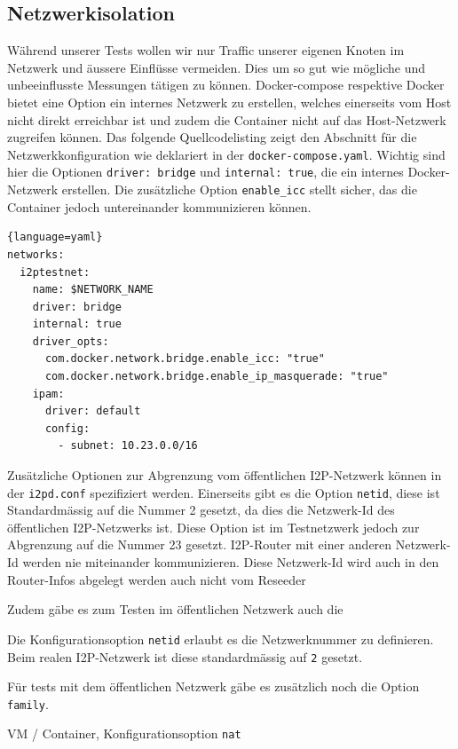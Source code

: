 \subsection{Netzwerkisolation}\label{sec:netzwerkisolation}

Während unserer Tests wollen wir nur Traffic unserer eigenen Knoten im Netzwerk und äussere Einflüsse vermeiden.
Dies um so gut wie mögliche und unbeeinflusste Messungen tätigen zu können.
Docker-compose respektive Docker bietet eine Option ein internes Netzwerk zu erstellen,
welches einerseits vom Host nicht direkt erreichbar ist
und zudem die Container nicht auf das Host-Netzwerk zugreifen können.
Das folgende Quellcodelisting zeigt den Abschnitt für die Netzwerkkonfiguration wie deklariert in der \lstinline|docker-compose.yaml|.
Wichtig sind hier die Optionen \lstinline|driver: bridge| und \lstinline|internal: true|, die ein internes Docker-Netzwerk erstellen.
Die zusätzliche Option \lstinline|enable_icc| stellt sicher, das die Container jedoch untereinander kommunizieren können.
\begin{lstlisting}{language=yaml}
networks:
  i2ptestnet:
    name: $NETWORK_NAME
    driver: bridge
    internal: true
    driver_opts:
      com.docker.network.bridge.enable_icc: "true"
      com.docker.network.bridge.enable_ip_masquerade: "true"
    ipam:
      driver: default
      config:
        - subnet: 10.23.0.0/16
\end{lstlisting}

Zusätzliche Optionen zur Abgrenzung vom öffentlichen I2P-Netzwerk können in der \lstinline|i2pd.conf| spezifiziert werden.
Einerseits gibt es die Option \lstinline|netid|, diese ist Standardmässig auf die Nummer 2 gesetzt, da dies die Netzwerk-Id des öffentlichen I2P-Netzwerks ist.
Diese Option ist im Testnetzwerk jedoch zur Abgrenzung auf die Nummer 23 gesetzt. 
I2P-Router mit einer anderen Netzwerk-Id werden nie miteinander kommunizieren.
Diese Netzwerk-Id wird auch in den Router-Infos abgelegt werden auch nicht vom Reseeder 

Zudem gäbe es zum Testen im öffentlichen Netzwerk auch die 

Die Konfigurationsoption \lstinline|netid| erlaubt es die Netzwerknummer zu definieren.
Beim realen I2P-Netzwerk ist diese standardmässig auf \lstinline|2| gesetzt.

Für tests mit dem öffentlichen Netzwerk gäbe es zusätzlich noch die Option \lstinline|family|.

VM / Container, Konfigurationsoption \lstinline|nat|


